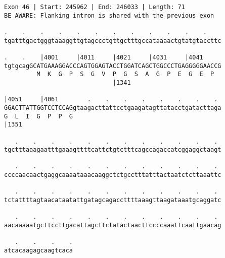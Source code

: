 \documentclass{article}
\begin{document}
\begin{Verbatim}
Exon 46 | Start: 245962 | End: 246033 | Length: 71
BE AWARE: Flanking intron is shared with the previous exon
 
.    .    .    .    .    .    .    .    .    .    .    .    
tgatttgactgggtaaaggttgtagccctgttgctttgccataaaactgtatgtaccttc
  
.    .    |4001     |4011     |4021     |4031     |4041     
tgtgcagGCATGAAAGGACCCAGTGGAGTACCTGGATCAGCTGGCCCTGAGGGGGAACCG
         M  K  G  P  S  G  V  P  G  S  A  G  P  E  G  E  P  
                              |1341                         
  
|4051     |4061        .    .    .    .    .    .    .    . 
GGACTTATTGGTCCTCCAGgtaagacttattcctgaagatagttatacctgatacttaga
G  L  I  G  P  P  G                                         
|1351                                                       
  
   .    .    .    .    .    .    .    .    .    .    .    . 
tgctttaaagaatttgaaagttttcattctgtctttcagccagaccatcggaggctaagt
  
   .    .    .    .    .    .    .    .    .    .    .    . 
ccccaacaactgaggcaaaataaacaaggctctgcctttatttactaatctcttaaattc
  
   .    .    .    .    .    .    .    .    .    .    .    . 
tctattttagtaacataatattgatagcagaccttttaaagttaagataaatgcaggatc
  
   .    .    .    .    .    .    .    .    .    .    .    . 
aacaaaaatgcttccttgacattagcttctatactaacttccccaaattcaattgaacag
  
   .    .    .    .
atcacaagagcaagtcaca
\end{Verbatim}
\newpage
\end{document}
